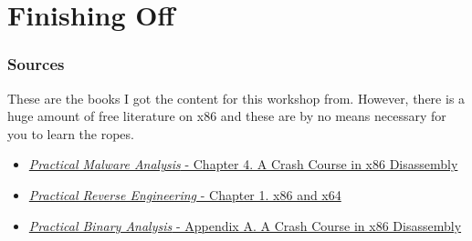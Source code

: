 \documentclass{beamer}
\begin{document}
	
	
	\section{Finishing Off}
	
	\begin{frame}
		\frametitle{Sources}
		
		These are the books I got the content for this workshop from. However, there is a huge amount of free literature on x86 and these are by no means necessary for you to learn the ropes. 
		\newline		
		
		\begin{itemize}
			\item \href{https://www.worldcat.org/search?q=bn:9781593274306}{\textit{Practical Malware Analysis} - Chapter 4. A Crash Course in x86 Disassembly}
			\item \href{https://www.worldcat.org/search?q=bn:9781593274306}{\textit{Practical Reverse Engineering} - Chapter 1. x86 and x64}
			\item \href{https://www.wiley.com/en-gb/Practical+Reverse+Engineering:+x86,+x64,+ARM,+Windows+Kernel,+Reversing+Tools,+and+Obfuscation-p-9781118787311}{\textit{Practical Binary Analysis} - Appendix A. A Crash Course in x86 Disassembly}
		\end{itemize}		
	\end{frame}
	
	
\end{document}
